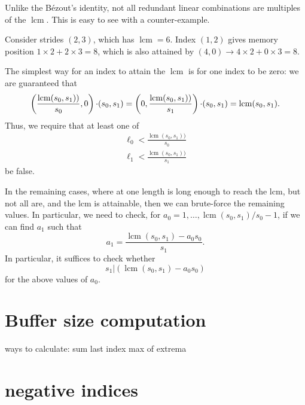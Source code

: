 \documentclass[12pt]{article}
\DeclareMathOperator{\lcm}{lcm}
\renewcommand{\(}{\left(}
\renewcommand{\)}{\right)}
\def\no#1{\nobreak{#1}} %
\begin{document}
Unlike the Bézout's identity, not all redundant linear combinations
are multiples of the $\lcm$.  This is easy to see with a counter-example.

Consider strides $(2,3)$, which has $\lcm=6$.  Index $(1,2)$ gives
memory position $1 \times{} 2 + 2 \times{} 3 = 8$, which is also attained by
$(4,0)\rightarrow{}4\times{}2 + 0\times{}3 = 8$.



The simplest way for an index to attain the $\lcm$ is for one index to
be zero: we are guaranteed that
\begin{dmath}
  \(\frac{\lcm(s_0,s_1))}{s_0}, 0\) \no\cdot (s_0, s_1) 
  =  \(0, \frac{\lcm(s_0,s_1))}{s_1}\) \no\cdot (s_0, s_1) 
  = \lcm(s_0,s_1).
\end{dmath}
Thus, we require that at least one of
\begin{eqnarray}
\ell_0<\frac{\lcm(s_0,s_1))}{s_0}\\
\ell_1<\frac{\lcm(s_0,s_1))}{s_1}
\end{eqnarray}
be false.


In the remaining cases, where at one length is long enough to reach
the lcm, but not all are, and the lcm is attainable, then we can
brute-force the remaining values.  In particular, we need to check,
for $a_0 = 1, \dots, \lcm(s_0,s_1)/s_0 - 1$, if we can find $a_1$ such
that
\begin{dmath}
  a_1 = \frac{\lcm(s_0,s_1) - a_0 s_0}{s_1}.
\end{dmath}
In particular, it suffices to check whether 
\begin{dmath}
  s_1  \vert \(\lcm(s_0,s_1) - a_0 s_0\)
\end{dmath}
for the above values of $a_0$. 



\section{Buffer size computation}

ways to calculate:
sum
last index
max of extrema


\section{negative indices}
\end{document}
